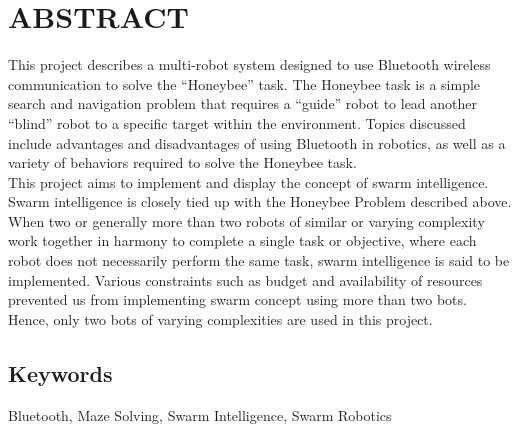 \section*{ABSTRACT}
\justify 
This project describes a multi-robot system designed to use Bluetooth wireless communication to solve the “Honeybee” task. The Honeybee task is a simple search and navigation problem that requires a “guide” robot to lead another “blind” robot to a specific target within the environment. Topics discussed include advantages and disadvantages of using Bluetooth in robotics, as well as a variety of behaviors required to solve the Honeybee task.\\
This project aims to implement and display the concept of swarm intelligence. Swarm intelligence is closely tied up with the Honeybee Problem described above. When two or generally more than two robots of similar or varying complexity work together in harmony to complete a single task or objective, where each robot does not necessarily perform the same task, swarm intelligence is said to be implemented. Various constraints such as budget and availability of resources prevented us from implementing swarm concept using more than two bots. Hence, only two bots of varying complexities are used in this project.
\subsection*{Keywords}
 Bluetooth, Maze Solving, Swarm Intelligence, Swarm Robotics \\
